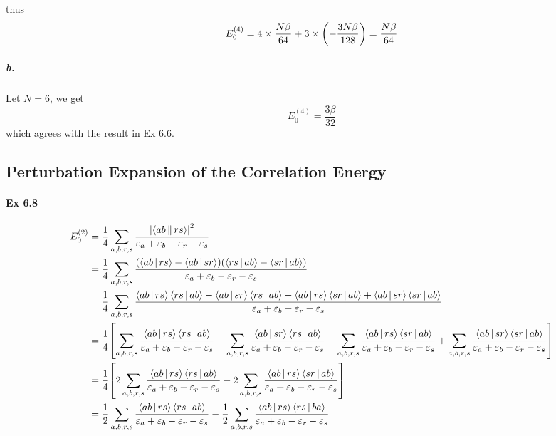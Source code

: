\documentclass[a4paper]{article}
\newcommand{\ex}[1]{\paragraph{Ex #1}}
\newcommand{\subex}[1]{\subparagraph{#1}}
\numberwithin{equation}{subsection}
\begin{document}
thus
\begin{equation}\label{key}
E_0^{(4)} = 4\times \dfrac{N\beta}{64} + 3\times\qty(-\dfrac{3N\beta}{128}) =  \dfrac{N\beta}{64}
\end{equation}

\subex{b.}
Let $ N=6 $, we get
\begin{equation}\label{key}
E_0^{(4)} = \dfrac{3\beta}{32}
\end{equation}
which agrees with the result in Ex 6.6.

\subsection{Perturbation Expansion of the Correlation Energy}
\ex{6.8}
\begin{align}
E_0^{(2)} &= 
\dfrac{1}{4}\sum_{a,b,r,s} \dfrac{\abs{\Braket{ab||rs}}^2}{\varepsilon_a + \varepsilon_b - \varepsilon_r - \varepsilon_s} \notag\\
&= \dfrac{1}{4}\sum_{a,b,r,s} 
\dfrac{\qty(\Braket{ab|rs} - \Braket{ab|sr}) \qty(\Braket{rs|ab} - \Braket{sr|ab})}{\varepsilon_a + \varepsilon_b - \varepsilon_r - \varepsilon_s} \notag\\
&= \dfrac{1}{4}\sum_{a,b,r,s} 
\dfrac{\Braket{ab|rs}\Braket{rs|ab} - \Braket{ab|sr}\Braket{rs|ab}  - \Braket{ab|rs}\Braket{sr|ab} + \Braket{ab|sr}\Braket{sr|ab}}{\varepsilon_a + \varepsilon_b - \varepsilon_r - \varepsilon_s} \notag\\
&= \dfrac{1}{4}\qty[\sum_{a,b,r,s} 
\dfrac{\Braket{ab|rs}\Braket{rs|ab}}{\varepsilon_a + \varepsilon_b - \varepsilon_r - \varepsilon_s}
- \sum_{a,b,r,s} 
\dfrac{\Braket{ab|sr}\Braket{rs|ab}}{\varepsilon_a + \varepsilon_b - \varepsilon_r - \varepsilon_s}
- \sum_{a,b,r,s} 
\dfrac{ \Braket{ab|rs}\Braket{sr|ab}}{\varepsilon_a + \varepsilon_b - \varepsilon_r - \varepsilon_s}
+ \sum_{a,b,r,s} 
\dfrac{\Braket{ab|sr}\Braket{sr|ab}}{\varepsilon_a + \varepsilon_b - \varepsilon_r - \varepsilon_s}
] \notag\\
&= \dfrac{1}{4}\qty[2\sum_{a,b,r,s} 
\dfrac{\Braket{ab|rs}\Braket{rs|ab}}{\varepsilon_a + \varepsilon_b - \varepsilon_r - \varepsilon_s}
- 2\sum_{a,b,r,s} 
\dfrac{\Braket{ab|rs}\Braket{sr|ab}}{\varepsilon_a + \varepsilon_b - \varepsilon_r - \varepsilon_s}
] \notag\\
&= \dfrac{1}{2}\sum_{a,b,r,s} 
\dfrac{\Braket{ab|rs}\Braket{rs|ab}}{\varepsilon_a + \varepsilon_b - \varepsilon_r - \varepsilon_s}
- \dfrac{1}{2}\sum_{a,b,r,s} 
\dfrac{\Braket{ab|rs}\Braket{rs|ba}}{\varepsilon_a + \varepsilon_b - \varepsilon_r - \varepsilon_s}
\end{align}
\end{document}
